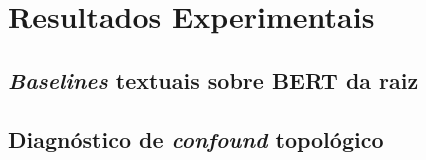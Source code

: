 
\chapter{Resultados Experimentais}
\label{cap:resultados}

%

\section{\emph{Baselines} textuais sobre BERT da raiz}
\label{sec:baseline_textual}




\section{Diagn\'ostico de \emph{confound} topol\'ogico}
\label{sec:confound}


